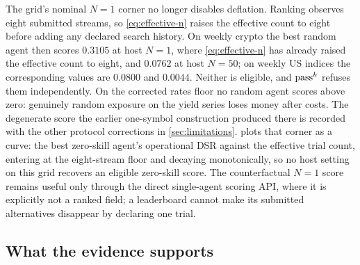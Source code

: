 The grid's nominal $N=1$ corner no longer disables deflation. Ranking observes eight submitted streams, so \cref{eq:effective-n} raises the effective count to eight before adding any declared search history. On weekly crypto the best random agent then scores $0.3105$ at host $N=1$, where \cref{eq:effective-n} has already raised the effective count to eight, and $0.0762$ at host $N=50$; on weekly US indices the corresponding values are $0.0800$ and $0.0044$. Neither is eligible, and $\text{pass}^{k}$ refuses them independently. On the corrected rates floor no random agent scores above zero: genuinely random exposure on the yield series loses money after costs. The degenerate score the earlier one-symbol construction produced there is recorded with the other protocol corrections in \cref{sec:limitations}.  plots that corner as a curve: the best zero-skill agent's operational DSR against the effective trial count, entering at the eight-stream floor and decaying monotonically, so no host setting on this grid recovers an eligible zero-skill score. The counterfactual $N=1$ score remains useful only through the direct single-agent scoring API, where it is explicitly not a ranked field; a leaderboard cannot make its submitted alternatives disappear by declaring one trial.





\subsection{What the evidence supports}\label{sec:claims}

